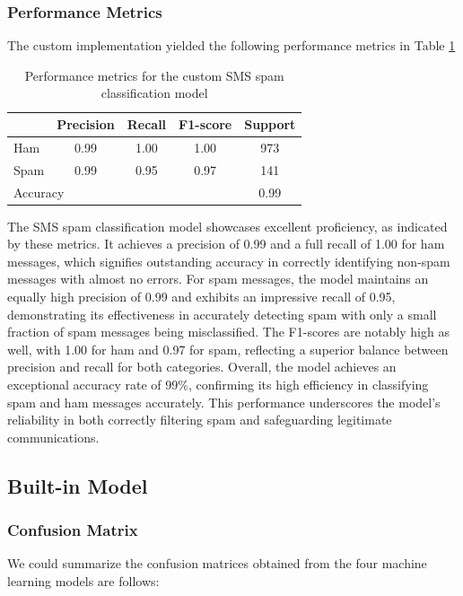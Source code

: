 \documentclass[12pt]{article}
\begin{document}
\subsubsection{Performance Metrics}
The custom implementation yielded the following performance metrics in Table \ref{tab:custom-performance_metrics}

\begin{table}[!htbp]
\centering
\begin{tabular}{|l|c|c|c|c|}
\hline
          & Precision & Recall & F1-score & Support \\ \hline
Ham       & 0.99      & 1.00   & 1.00     & 973     \\ \hline
Spam      & 0.99      & 0.95   & 0.97     & 141     \\ \hline
\multicolumn{4}{|l|}{Accuracy}             & 0.99    \\ \hline
\end{tabular}
\caption{Performance metrics for the custom SMS spam classification model}
\label{tab:custom-performance_metrics}
\end{table}

The SMS spam classification model showcases excellent proficiency, as indicated by these metrics. It achieves a precision of 0.99 and a full recall of 1.00 for ham messages, which signifies outstanding accuracy in correctly identifying non-spam messages with almost no errors. For spam messages, the model maintains an equally high precision of 0.99 and exhibits an impressive recall of 0.95, demonstrating its effectiveness in accurately detecting spam with only a small fraction of spam messages being misclassified. The F1-scores are notably high as well, with 1.00 for ham and 0.97 for spam, reflecting a superior balance between precision and recall for both categories. Overall, the model achieves an exceptional accuracy rate of 99\%, confirming its high efficiency in classifying spam and ham messages accurately. This performance underscores the model's reliability in both correctly filtering spam and safeguarding legitimate communications.

\subsection{Built-in Model}
\subsubsection{Confusion Matrix}
We could summarize the confusion matrices obtained from the four machine learning models are follows:
\end{document}
